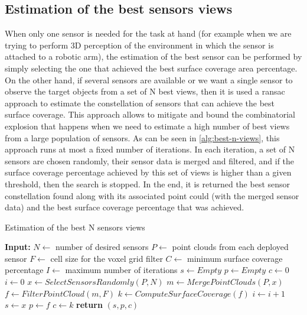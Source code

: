 \subsection{Estimation of the best sensors views}

When only one sensor is needed for the task at hand (for example when we are trying to perform 3D perception of the environment in which the sensor is attached to a robotic arm), the estimation of the best sensor can be performed by simply selecting the one that achieved the best surface coverage area percentage. On the other hand, if several sensors are available or we want a single sensor to observe the target objects from a set of N best views, then it is used a \gls{ransac} approach to estimate the constellation of sensors that can achieve the best surface coverage. This approach allows to mitigate and bound the combinatorial explosion that happens when we need to estimate a high number of best views from a large population of sensors. As can be seen in \cref{alg:best-n-views}, this approach runs at most a fixed number of iterations. In each iteration, a set of N sensors are chosen randomly, their sensor data is merged and filtered, and if the surface coverage percentage achieved by this set of views is higher than a given threshold, then the search is stopped. In the end, it is returned the best sensor constellation found along with its associated point could (with the merged sensor data) and the best surface coverage percentage that was achieved.

\begin{algorithm}
	\caption{Estimation of the best N sensors views}
	\label{alg:best-n-views}
	\begin{algorithmic}[1]
		\State \textbf{Input:}
		\State $N \gets$ number of desired sensors
		\State $P \gets$ point clouds from each deployed sensor
		\State $F \gets$ cell size for the voxel grid filter
		\State $C \gets$ minimum surface coverage percentage
		\State $I \gets$ maximum number of iterations
			\State $s \gets Empty$
			\State $p \gets Empty$
			\State $c \gets 0$
			\State $i \gets 0$
				\State $x \gets SelectSensorsRandomly(P,N)$
				\State $m \gets MergePointClouds(P,x)$
				\State $f \gets FilterPointCloud(m,F)$
				\State $k \gets ComputeSurfaceCoverage(f)$
				\State $i \gets i + 1$
					\State $s \gets x$
					\State $p \gets f$
					\State $c \gets k$
				\EndIf
			\EndWhile
			\State \textbf{return} $(s,p,c)$
		\EndProcedure
	\end{algorithmic}
\end{algorithm}
